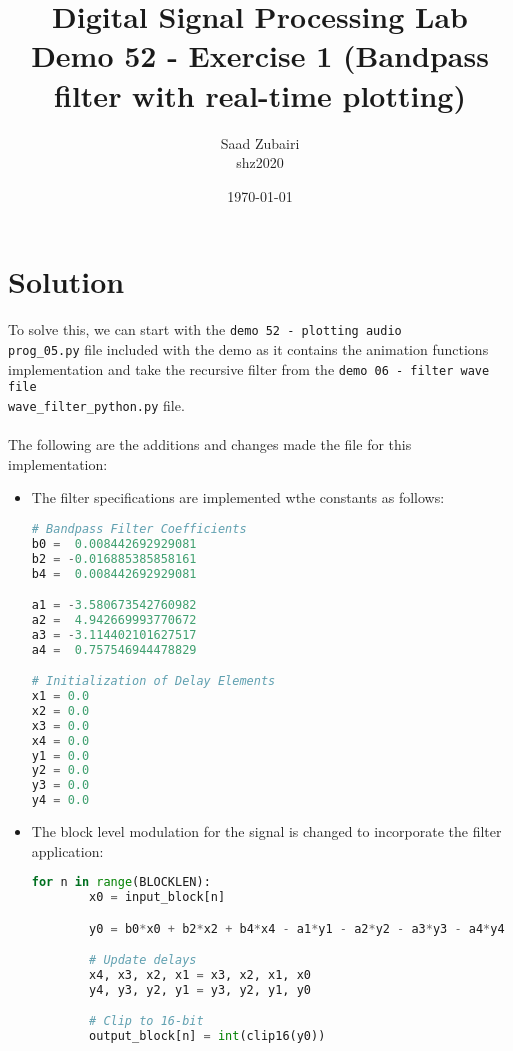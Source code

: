 \documentclass[11pt]{article}
\title{
    \vspace{3em}
    \textbf{Digital Signal Processing Lab}\\
    Demo 52 - Exercise 1 (Bandpass filter with real-time plotting)
    \vspace{1em}
}
\author{
    Saad Zubairi \\ 
    shz2020 \\
    \vspace{1em}
}
\date{\today}
\begin{document}
\maketitle	

\pagebreak



\section*{Solution}

To solve this, we can start with the \texttt{demo 52 - plotting audio\\prog\_05.py} file included with the demo as it contains the animation functions implementation and take the recursive filter from the \texttt{demo 06 - filter wave file\\wave\_filter\_python.py} file.
\\
\\
The following are the additions and changes made the file for this implementation:

\begin{itemize}
    \item The filter specifications are implemented wthe constants as follows:
    \begin{lstlisting}[language=python, label={lst:code}, breaklines=true, caption={Filter initialization}]
    # Bandpass Filter Coefficients
b0 =  0.008442692929081
b2 = -0.016885385858161
b4 =  0.008442692929081

a1 = -3.580673542760982
a2 =  4.942669993770672
a3 = -3.114402101627517
a4 =  0.757546944478829

# Initialization of Delay Elements
x1 = 0.0
x2 = 0.0
x3 = 0.0
x4 = 0.0
y1 = 0.0
y2 = 0.0
y3 = 0.0
y4 = 0.0
    \end{lstlisting}        

    \item The block level modulation for the signal is changed to incorporate the filter application:
    \begin{lstlisting}[language=python, label={lst:code}, breaklines=true, caption={Block level output processing}]
    for n in range(BLOCKLEN):
        x0 = input_block[n]

        y0 = b0*x0 + b2*x2 + b4*x4 - a1*y1 - a2*y2 - a3*y3 - a4*y4

        # Update delays
        x4, x3, x2, x1 = x3, x2, x1, x0
        y4, y3, y2, y1 = y3, y2, y1, y0

        # Clip to 16-bit
        output_block[n] = int(clip16(y0))
    \end{lstlisting}   
    
\end{itemize}
\end{document}

